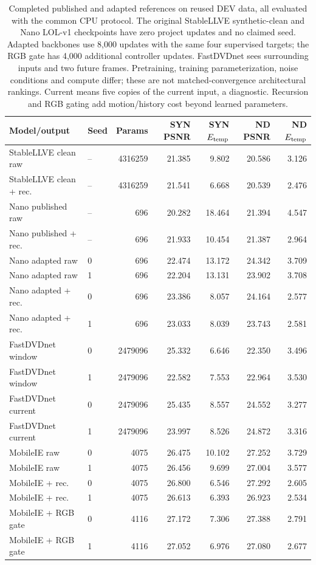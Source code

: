 \begin{table}[t]
\centering\scriptsize\setlength{\tabcolsep}{4pt}
\caption{Completed published and adapted references on reused DEV data, all evaluated with the common CPU protocol. The original StableLLVE synthetic-clean and Nano LOL-v1 checkpoints have zero project updates and no claimed seed. Adapted backbones use 8,000 updates with the same four supervised targets; the RGB gate has 4,000 additional controller updates. FastDVDnet sees surrounding inputs and two future frames. Pretraining, training parameterization, noise conditions and compute differ; these are not matched-convergence architectural rankings. Current means five copies of the current input, a diagnostic. Recursion and RGB gating add motion/history cost beyond learned parameters.}
\label{tab:published-adapted}
\begin{tabular}{llrrrrr}
\toprule
Model/output & Seed & Params & SYN PSNR & SYN $E_{\rm temp}$ & ND PSNR & ND $E_{\rm temp}$\\
\midrule
StableLLVE clean raw & -- & 4316259 & 21.385 & 9.802 & 20.586 & 3.126\\
StableLLVE clean + rec. & -- & 4316259 & 21.541 & 6.668 & 20.539 & 2.476\\
Nano published raw & -- & 696 & 20.282 & 18.464 & 21.394 & 4.547\\
Nano published + rec. & -- & 696 & 21.933 & 10.454 & 21.387 & 2.964\\
\midrule
Nano adapted raw & 0 & 696 & 22.474 & 13.172 & 24.342 & 3.709\\
Nano adapted raw & 1 & 696 & 22.204 & 13.131 & 23.902 & 3.708\\
Nano adapted + rec. & 0 & 696 & 23.386 & 8.057 & 24.164 & 2.577\\
Nano adapted + rec. & 1 & 696 & 23.033 & 8.039 & 23.743 & 2.581\\
FastDVDnet window & 0 & 2479096 & 25.332 & 6.646 & 22.350 & 3.496\\
FastDVDnet window & 1 & 2479096 & 22.582 & 7.553 & 22.964 & 3.530\\
FastDVDnet current & 0 & 2479096 & 25.435 & 8.557 & 24.552 & 3.277\\
FastDVDnet current & 1 & 2479096 & 23.997 & 8.526 & 24.872 & 3.316\\
MobileIE raw & 0 & 4075 & 26.475 & 10.102 & 27.252 & 3.729\\
MobileIE raw & 1 & 4075 & 26.456 & 9.699 & 27.004 & 3.577\\
MobileIE + rec. & 0 & 4075 & 26.800 & 6.546 & 27.292 & 2.605\\
MobileIE + rec. & 1 & 4075 & 26.613 & 6.393 & 26.923 & 2.534\\
MobileIE + RGB gate & 0 & 4116 & 27.172 & 7.306 & 27.388 & 2.791\\
MobileIE + RGB gate & 1 & 4116 & 27.052 & 6.976 & 27.080 & 2.677\\
\bottomrule
\end{tabular}
\end{table}
